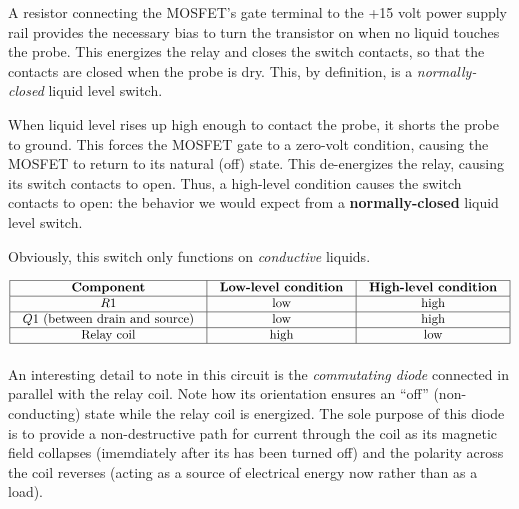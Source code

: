 \documentclass[12pt,a4paper]{article}
\begin{document}
\vskip 10pt

A resistor connecting the MOSFET's gate terminal to the +15 volt power supply rail provides the necessary bias to turn the transistor on when no liquid touches the probe.  This energizes the relay and closes the switch contacts, so that the contacts are closed when the probe is dry.  This, by definition, is a {\it normally-closed} liquid level switch.

\vskip 10pt

When liquid level rises up high enough to contact the probe, it shorts the probe to ground.  This forces the MOSFET gate to a zero-volt condition, causing the MOSFET to return to its natural (off) state.  This de-energizes the relay, causing its switch contacts to open.  Thus, a high-level condition causes the switch contacts to open: the behavior we would expect from a {\bf normally-closed} liquid level switch.

\vskip 10pt

Obviously, this switch only functions on {\it conductive} liquids.


$$\vbox{\offinterlineskip
\halign{\strut
\vrule \quad\hfil # \ \hfil & 
\vrule \quad\hfil # \ \hfil & 
\vrule \quad\hfil # \ \hfil \vrule \cr
\noalign{\hrule}
%
{\bf Component} & {\bf Low-level condition} & {\bf High-level condition} \cr
%
\noalign{\hrule}
%
$R1$ & low & high \cr
%
\noalign{\hrule}
%
$Q1$ (between drain and source) & low & high \cr
%
\noalign{\hrule}
%
Relay coil & high & low \cr
%
\noalign{\hrule}
} %
}$$ %

\vskip 10pt

An interesting detail to note in this circuit is the {\it commutating diode} connected in parallel with the relay coil.  Note how its orientation ensures an ``off'' (non-conducting) state while the relay coil is energized.  The sole purpose of this diode is to provide a non-destructive path for current through the coil as its magnetic field collapses (imemdiately after its has been turned off) and the polarity across the coil reverses (acting as a source of electrical energy now rather than as a load).


\vfil \eject 
\end{document}
